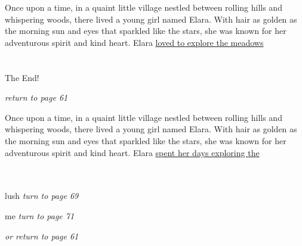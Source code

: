 \documentclass{memoir}
\begin{document}
        


        \hspace{1cm}\vfill
        \begin{minipage}{3in}
        \LARGE
        Once upon a time, in a quaint little village nestled between rolling hills and whispering woods, there lived a young girl named Elara. With hair as golden as the morning sun and eyes that sparkled like the stars, she was known for her adventurous spirit and kind heart. Elara \ul{loved to explore the meadows}\\ \vspace{5mm} \\
 \\\vspace{1cm} The End! \\ 

        \hspace{1cm}\begin{minipage}{6cm}
        \normalsize
            \hfill \textit{return to page 61}
        \end{minipage} 
        \end{minipage}
        \hspace{1cm}\vfill
        \cleardoublepage

        


        \hspace{1cm}\vfill
        \begin{minipage}{3in}
        \LARGE
        Once upon a time, in a quaint little village nestled between rolling hills and whispering woods, there lived a young girl named Elara. With hair as golden as the morning sun and eyes that sparkled like the stars, she was known for her adventurous spirit and kind heart. Elara \ul{spent her days exploring the}\\ \vspace{5mm} \\
  \\ 

        \hspace{1cm}\begin{minipage}{6cm}
        \normalsize
            lush \hfill \textit{turn to page 69}\\ \vspace{5mm}

me \hfill \textit{turn to page 71}\\ \vspace{5mm}

\hfill \textit{or return to page 61}
        \end{minipage} 
        \end{minipage}
        \hspace{1cm}\vfill
        \cleardoublepage
\end{document}
